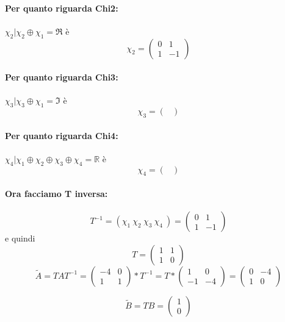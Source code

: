 \documentclass{article}
\begin{document}
\paragraph{Per quanto riguarda Chi2:} $ \chi_2 | \chi_2 \oplus \chi_1 = \mathfrak{R} $ è \[ \chi_2 = \left(\begin{matrix}0 & 1\\1 & -1\end{matrix}\right) \]

\paragraph{Per quanto riguarda Chi3:} $ \chi_3 | \chi_3 \oplus \chi_1 = \mathfrak{I} $ è \[ \chi_3 = \left(\begin{matrix}\end{matrix}\right) \]

\paragraph{Per quanto riguarda Chi4:} $ \chi_4 | \chi_1 \oplus \chi_2 \oplus  \chi_3 \oplus \chi_4 = \mathbb{R} $ è \[ \chi_4 = \left(\begin{matrix}\end{matrix}\right) \]
\paragraph{Ora facciamo T inversa:} \[ T^{-1} = (\chi_1\ \chi_2\ \chi_3\ \chi_4\ ) = \left(\begin{matrix}0 & 1\\1 & -1\end{matrix}\right) \]
e quindi \[T = \left(\begin{matrix}1 & 1\\1 & 0\end{matrix}\right)\]
\[ \widetilde{A} = TAT^{-1} = \left(\begin{matrix}-4 & 0\\1 & 1\end{matrix}\right) * T^{-1} = T*\left(\begin{matrix}1 & 0\\-1 & -4\end{matrix}\right) =\left(\begin{matrix}0 & -4\\1 & 0\end{matrix}\right) \]

\[ \widetilde{B} = T B = \left(\begin{matrix}1\\0\end{matrix}\right) \]
\end{document}
